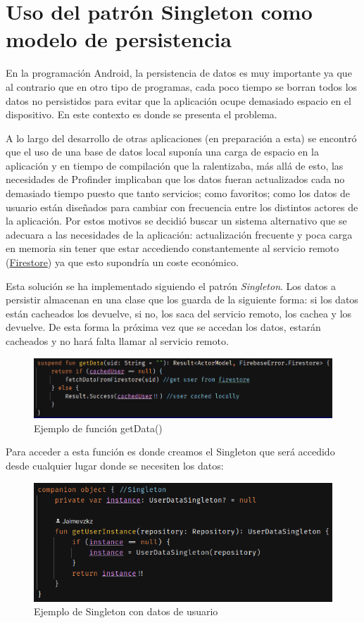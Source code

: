 \section{Uso del patrón Singleton como modelo de persistencia}
En la programación Android, la persistencia de datos es muy importante ya que al contrario que en otro tipo de programas, cada poco tiempo se borran todos los datos no persistidos para evitar que la aplicación ocupe demasiado espacio en el dispositivo. En este contexto es donde se presenta el problema.

A lo largo del desarrollo de otras aplicaciones (en preparación a esta) se encontró que el uso de una base de datos local suponía una carga de espacio en la aplicación y en tiempo de compilación que la ralentizaba, más allá de esto, las necesidades de Profinder implicaban que los datos fueran actualizados cada no demasiado tiempo puesto que tanto servicios; como favoritos; como los datos de usuario están diseñados para cambiar con frecuencia entre los distintos actores de la aplicación. Por estos motivos se decidió buscar un sistema alternativo que se adecuara a las necesidades de la aplicación: actualización frecuente y poca carga en memoria sin tener que estar accediendo constantemente al servicio remoto (\hyperlink{subsec:firestore}{Firestore}) ya que esto supondría un coste económico.

Esta solución se ha implementado siguiendo el patrón \textit{Singleton}. Los datos a persistir almacenan en una clase que los guarda de la siguiente forma: si los datos están cacheados los devuelve, si no, los saca del servicio remoto, los cachea y los devuelve. De esta forma la próxima vez que se accedan los datos, estarán cacheados y no hará falta llamar al servicio remoto.
\begin{figure}[h]
    \centering
    \includegraphics[width = 1\textwidth]{Imagenes/Fuentes/ejemplo_singleton1.png}
    \caption{Ejemplo de función getData()}
    \label{fig:ejemplo_singleton1}
\end{figure}

Para acceder a esta función es donde creamos el Singleton que será accedido desde cualquier lugar donde se necesiten los datos:
\begin{figure}[h]
    \centering
    \includegraphics[width = 1\textwidth]{Imagenes/Fuentes/ejemplo_singleton2.png}
    \caption{Ejemplo de Singleton con datos de usuario}
    \label{fig:ejemplo_singleton2}
\end{figure}